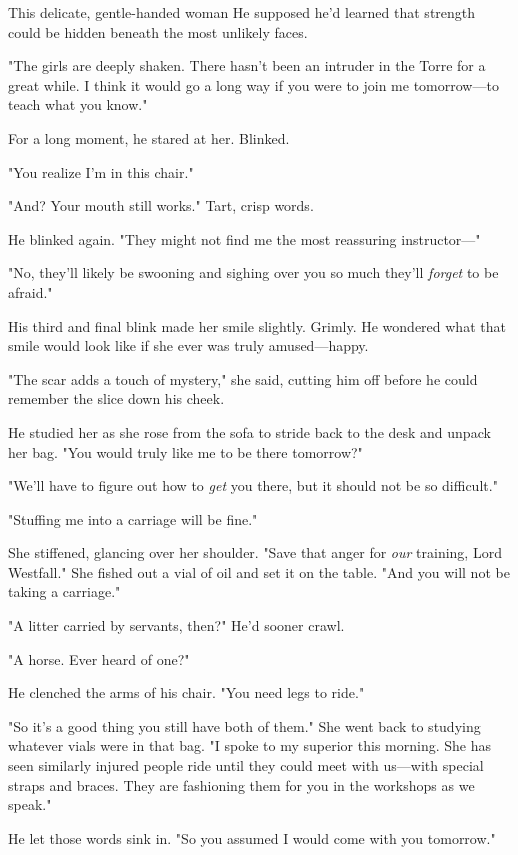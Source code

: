 This delicate, gentle-handed woman  He supposed he'd learned that strength could be hidden beneath the most unlikely faces.

"The girls are deeply shaken. There hasn't been an intruder in the Torre for a great while. I think it would go a long way if you were to join me tomorrow---to teach what you know."

For a long moment, he stared at her. Blinked.

"You realize I'm in this chair."

"And? Your mouth still works." Tart, crisp words.

He blinked again. "They might not find me the most reassuring instructor---"

"No, they'll likely be swooning and sighing over you so much they'll
\emph{forget} to be afraid."

His third and final blink made her smile slightly. Grimly. He wondered what that smile would look like if she ever was truly amused---happy.

"The scar adds a touch of mystery," she said, cutting him off before he could remember the slice down his cheek.

He studied her as she rose from the sofa to stride back to the desk and unpack her bag. "You would truly like me to be there tomorrow?"

"We'll have to figure out how to \emph{get} you there, but it should not be so difficult."

"Stuffing me into a carriage will be fine."

She stiffened, glancing over her shoulder. "Save that anger for
\emph{our} training, Lord Westfall." She fished out a vial of oil and set it on the table. "And you will not be taking a carriage."

"A litter carried by servants, then?" He'd sooner crawl.

"A horse. Ever heard of one?"

He clenched the arms of his chair. "You need legs to ride."

"So it's a good thing you still have both of them." She went back to studying whatever vials were in that bag. "I spoke to my superior this morning. She has seen similarly injured people ride until they could meet with us---with special straps and braces. They are fashioning them for you in the workshops as we speak."

He let those words sink in. "So you assumed I would come with you tomorrow."

